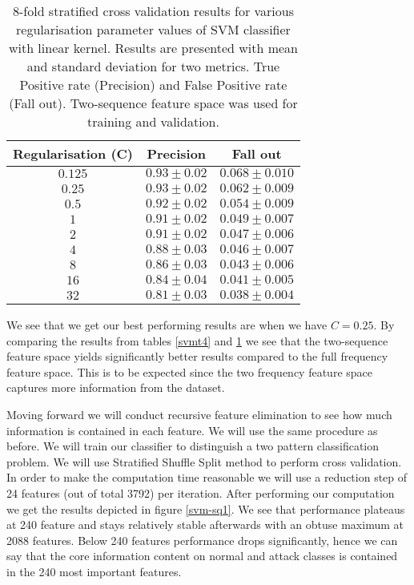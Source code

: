 \documentclass[reqno,openany,12pt]{amsbook}
\begin{document}
\begin{table}
\begin{tabular}{|c|c|c|}
\hline
Regularisation (C) &  Precision & Fall out \\ \hline 
$0.125$ &  $0.93 \pm 0.02$ & $0.068 \pm 0.010$ \\ \hline 
$0.25$ &  $0.93 \pm 0.02$ & $0.062 \pm 0.009$ \\ \hline 
$0.5$ &  $0.92 \pm 0.02$ & $0.054 \pm 0.009$ \\ \hline 
$1$ &  $0.91 \pm 0.02$ & $0.049 \pm 0.007$ \\ \hline 
$2$ &  $0.91 \pm 0.02$ & $0.047 \pm 0.006$ \\ \hline 
$4$ &  $0.88 \pm 0.03$ & $0.046 \pm 0.007$ \\ \hline 
$8$ &  $0.86 \pm 0.03$ & $0.043 \pm 0.006$ \\ \hline 
$16$ &  $0.84 \pm 0.04$ & $0.041\pm 0.005$ \\ \hline 
$32$ &  $0.81 \pm 0.03$ & $0.038 \pm 0.004$ \\ \hline
\end{tabular}
\vspace{5pt}
\caption[Cross Validation and Linear SVM regularisation on complete two-sequence feature space.]{8-fold stratified cross validation results for various regularisation parameter values of SVM classifier with linear kernel. Results are presented with mean and standard deviation for two metrics. True Positive rate (Precision) and False Positive rate (Fall out). Two-sequence feature space was used for training and validation.}
\label{svmt5}
\end{table}

We see that we get our best performing results are when we have $C=0.25$. By comparing the results from tables \ref{svmt4} and \ref{svmt5} we see that the two-sequence feature space yields significantly better results compared to the full frequency feature space. This is to be expected since the two frequency feature space captures more information from the dataset.

Moving forward we will conduct recursive feature elimination to see how much information is contained in each feature. We will use the same procedure as before. We will train our classifier to distinguish a two pattern classification problem. We will use Stratified Shuffle Split method to perform cross validation. In order to make the computation time reasonable we will use a reduction step of 24 features (out of total 3792) per iteration. After performing our computation we get the results depicted in figure \ref{svm-sq1}. We see that performance plateaus at 240 feature and stays relatively stable afterwards with an obtuse maximum at 2088 features. Below 240 features performance drops significantly, hence we can say that the core information content on normal and attack classes is contained in the 240 most important features.
\end{document}
